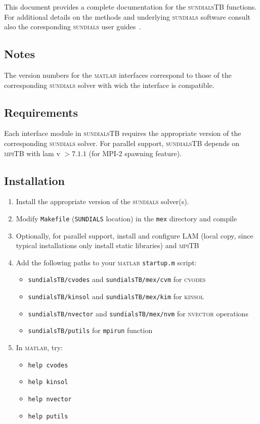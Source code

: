 \documentclass[titlepage,10pt]{article}
\newcommand{\sundialsTB}{{\normalfont\scshape sundialsTB}}
\newcommand{\sundials}{{\normalfont\scshape sundials}}
\newcommand{\nvector}{{\normalfont\scshape nvector}}
\newcommand{\cvodes}{{\normalfont\scshape cvodes}}
\newcommand{\ida}{{\normalfont\scshape ida}}
\newcommand{\kinsol}{{\normalfont\scshape kinsol}}
\newcommand{\matlab}{{\normalfont\scshape matlab}}
\newcommand{\mpiTB}{{\normalfont\scshape mpiTB}}
\begin{document}
This document provides a complete documentation for the {\sundialsTB} functions.
For additional details on the methods and underlying {\sundials} software consult
also the coresponding {\sundials} user guides~\cite{cvodes_ug,kinsol_ug}.

\subsection{Notes}

The version numbers for the {\matlab} interfaces correspond to those of the 
corresponding {\sundials} solver with wich the interface is compatible.

\subsection{Requirements}

Each interface module in {\sundialsTB} requires the appropriate version of the 
corresponding {\sundials} solver. For parallel support, {\sundialsTB} depends on
{\mpiTB} with {\sc lam} v $> 7.1.1$ (for MPI-2 spawning feature).

\subsection{Installation} 

\begin{enumerate}
\item Install the appropriate version of the {\sundials} solver(s).
\item Modify {\tt Makefile} ({\tt SUNDIALS} location) in the {\tt mex} directory 
  and compile
\item Optionally, for parallel support, install and configure {\sc LAM} 
  (local copy, since typical installations only install static libraries) and {\mpiTB}
\item Add the following paths to your {\matlab} {\tt startup.m} script:
  \begin{itemize}
  \item {\tt sundialsTB/cvodes} and {\tt sundialsTB/mex/cvm}   for {\cvodes}
  \item {\tt sundialsTB/kinsol} and {\tt sundialsTB/mex/kim}   for {\kinsol}
  \item {\tt sundialsTB/nvector} and {\tt sundialsTB/mex/nvm}  for {\nvector} operations
  \item {\tt sundialsTB/putils}                                for {\tt mpirun} function
  \end{itemize}
\item In {\matlab}, try:
  \begin{itemize}
  \item {\tt help cvodes}
  \item {\tt help kinsol}
  \item{\tt help nvector}
  \item {\tt help putils}
  \end{itemize}
\end{enumerate}
\end{document}

